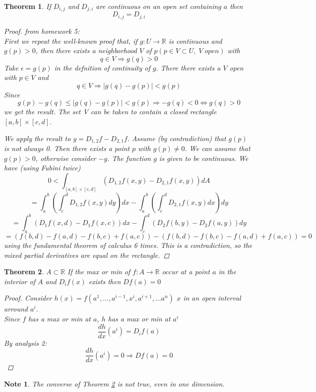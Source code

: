 \documentclass[12pt]{article}
\def\RR{\mathbb{R}}
\newtheorem{theorem}{Theorem}[section]
\newtheorem*{note}{Note}
\begin{document}
\begin{theorem}
If $D_{i,j}$ and $D_{j,i}$ are continuous on an open set containing $a$ then
 \[D_{i,j} = D_{j,i}\]
\begin{proof} from homework 5:\\ 
First we repeat the well-known proof that, if $g : U \rightarrow \RR$ is continuous and $g(p) > 0$,
then there exists a neighborhood $V$ of $ p (p \in V \subset U,\; V \; open)$ with
\[q \in V \Rightarrow g(q) > 0\]
Take $\epsilon = g(p)$ in the defnition of continuity of $g$. There there exists a $V$ open with
$p \in V$ and
\[q \in V \Rightarrow |g(q) - g(p)| < g(p)\]
Since 
\[g(p) - g(q) \leq |g(q) - g(p)| < g(p) \Rightarrow  -g(q) < 0 \Leftrightarrow g(q) > 0\]
we get the result. The set V can be taken to contain a closed rectangle $[a, b] \! \times\! [c, d]$.

We apply the result to $g = D_{1,2}f - D_{2,1}f$. Assume (by contradiction) that $g(p)$ is not
always 0. Then there exists a point $p$ with $g(p) \neq 0$. We can assume that $g(p) > 0$,
otherwise consider $-g$. The function $g$ is given to be continuous. We have (using
Fubini twice)
\[0<\int_{[a, b] \! \times\! [c, d]}(D_{1,2}f(x,y) - D_{2,1}f(x,y))dA\]
\[=\int_{a}^{b}\left(\int_{c}^{d}D_{1,2}f(x,y)dy\right)dx - \int_{a}^{b}\left(\int_{c}^{d}D_{2,1}f(x,y)dx\right)dy\]
\[= \int_{a}^{b}\left(D_{1}f(x,d) - D_{1}f(x,c)\right)dx - \int_{c}^{d}\left(D_{2}f(b,y) - D_{2}f(a,y)\right)dy\]
\[= (f(b, d)-  f(a, d) - f(b, c) + f(a, c)) - (f(b, d)-  f(b, c) - f(a, d) + f(a, c)) = 0\]
using the fundamental theorem of calculus 6 times. This is a contradiction, so the
mixed partial derivatives are equal on the rectangle.
\end{proof}
\end{theorem}

\begin{theorem}\label{maxmin}
$A \subset \RR$ If the max or min of $f:A \rightarrow \RR$ occur at a point $a$ in the interior of $A$ and $D_{i}f(x)$ exists then $Df(a) = 0$
\begin{proof}
Consider $h(x) = f(a^{1}, \dots , a^{i-1} , x^{i}, a^{i+1}, \dots a^{n})$ $x$ in an open interval arround $a^{i}$.\\ Since $f$ has a max or min at $a$, $h$ has a max or min at $a^{i}$
\[\frac{dh}{dx}(a^{i}) = D_{i}f(a)\]
By analysis 2:
\[\frac{dh}{dx}(a^{i}) =0 \Rightarrow Df(a) = 0\]
\end{proof}
\end{theorem}

\begin{note}
The converse of Theorem \ref{maxmin} is not true, even in one dimension.
\end{note}
\end{document}
